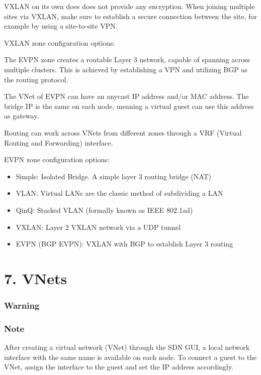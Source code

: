 VXLAN on its own does does not provide any encryption. When joining multiple sites via VXLAN, make sure to establish a secure connection between the site, for example by using a site-to-site VPN.

VXLAN zone configuration options:

The EVPN zone creates a routable Layer 3 network, capable of spanning across multiple clusters. This is achieved by establishing a VPN and utilizing BGP as the routing protocol.

The VNet of EVPN can have an anycast IP address and/or MAC address. The bridge IP is the same on each node, meaning a virtual guest can use this address as gateway.

Routing can work across VNets from different zones through a VRF (Virtual Routing and Forwarding) interface.

EVPN zone configuration options:

\begin{itemize}[leftmargin=2cm]

	\item Simple: Isolated Bridge. A simple layer 3 routing bridge (NAT)

	\item VLAN: Virtual LANs are the classic method of subdividing a LAN

	\item QinQ: Stacked VLAN (formally known as IEEE 802.1ad)

	\item VXLAN: Layer 2 VXLAN network via a UDP tunnel

	\item EVPN (BGP EVPN): VXLAN with BGP to establish Layer 3 routing

\end{itemize}


\section{7. VNets}

\subsubsection{Warning}

\subsubsection{Note}

After creating a virtual network (VNet) through the SDN GUI, a local network interface with the same name is available on each node. To connect a guest to the VNet, assign the interface to the guest and set the IP address accordingly.

